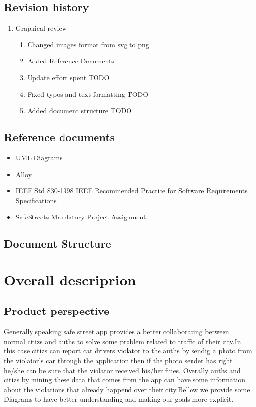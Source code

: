 \documentclass{article}
\newcommand{\link}[2]{{\color{blue}\underline{\href{#1}{#2}}}}
\begin{document}
	\subsection{Revision history}
		\begin{enumerate}
			\item Graphical review
			\begin{enumerate}[label*=\arabic*.]
				\item Changed images format from svg to png
				\item Added Reference Documents
				\item Update effort spent TODO
				\item Fixed typos and text formatting	TODO
				\item Added document structure	TODO
				
			\end{enumerate}
		\end{enumerate}
	\subsection{Reference documents}
		\begin{itemize}
			\item \link{https://www.uml-diagrams.org/}{UML Diagrams}
			\item \link{http://alloy.lcs.mit.edu/alloy/documentation.html}{Alloy}
			\item \link{http://www.math.uaa.alaska.edu/~afkjm/cs401/IEEE830.pdf}{IEEE	Std	830-1998	IEEE	Recommended	Practice	for	Software	Requirements	Specifications}
			\item \link{https://drive.google.com/file/d/1VYhcYWY0I6FrwtEWGsfs-CzNf0mMMaP2/view?usp=sharing}{SafeStreets Mandatory Project Assignment}
		\end{itemize}
	\subsection{Document Structure}

\newpage
\section{Overall descriprion}

	

	\subsection{Product perspective} Generally speaking safe street app provides a better collaborating between normal citizs and auths to solve some problem related to traffic of their city.In this case citizs can report car drivers violator to the auths by sendig a photo from the violator's car through the application then if the photo sender has right he/she can be sure that the violator received his/her fines. Overally auths and citizs by mining these data that comes from the app can have some information about the violations that already happend over their city.Bellow we provide some Diagrams to have better understanding and making our goals more explicit.
	
\end{document}
